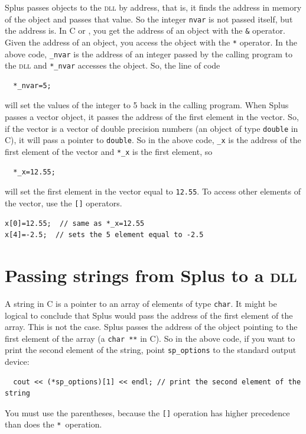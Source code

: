 Splus passes objects to the \textsc{dll} by address, that is, it
finds the address in memory of the object and passes that value.
So the integer \texttt{nvar} is not passed itself, but the address is. In
C or \cplus, you get the address of an object with the \texttt{\&}
operator.  Given the address of an object, you access the 
object with the \texttt{*} operator. In the above code,
\texttt{\_nvar} is the address of an integer passed by 
the calling program to the \textsc{dll} and \texttt{*\_nvar}
accesses the object. So, the line of code
\begin{lstlisting}
  *_nvar=5;
\end{lstlisting}
will set the values of the integer to 5 back in the calling 
program.
When Splus passes a vector object, it passes the address of the
first element in the vector. So, if the vector is a vector of
double precision numbers (an object of type \texttt{double} in C),
it will pass a pointer to \texttt{double}. So in the above code,
\texttt{\_x} is the address of the first element of the vector
and \texttt{*\_x} is the first element, so
\begin{lstlisting}
  *_x=12.55;
\end{lstlisting}
will set the first element in the vector equal to \texttt{12.55}.
To access other  elements of the vector, use the \texttt{[]} operators.
\begin{lstlisting}
x[0]=12.55;  // same as *_x=12.55
x[4]=-2.5;  // sets the 5 element equal to -2.5
\end{lstlisting}


\section{Passing strings from Splus to a \textsc{dll}}

A string in C is a pointer to an array of elements of type \texttt{char}.
It might be logical to conclude that Splus would pass the
address of the first element of the array. This is not
the case.  Splus passes the address of the object pointing to the 
first element of the array (a \texttt{char **} in C).
So in the above code, if you want to print the second element of the
string, point \texttt{sp\_options} to the standard output
device:
\begin{lstlisting}
  cout << (*sp_options)[1] << endl; // print the second element of the string
\end{lstlisting}
You must use the parentheses, because the \texttt{[]} operation has
higher precedence than does the \texttt{*}~operation.


